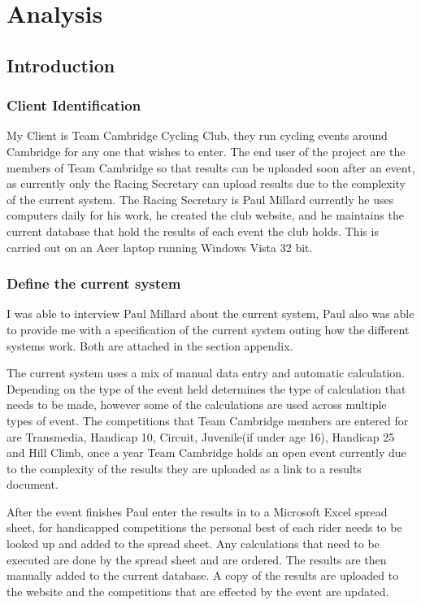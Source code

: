 \chapter{Analysis}

\section{Introduction}

\subsection{Client Identification}
My Client is Team Cambridge Cycling Club, they run cycling events around Cambridge for any one that wishes to enter. The end user of the project are the members of Team Cambridge so that results can be uploaded soon after an event, as currently only the Racing Secretary can upload results due to the complexity of the current system. The Racing Secretary is Paul Millard currently he uses computers daily for his work, he created the club website, and he maintains the current database that hold the results of each event the club holds. This is carried out on an Acer laptop running Windows Vista 32 bit.
\subsection{Define the current system}
I was able to interview Paul Millard about the current system, Paul also was able to provide me with a specification of the current system outing how the different systems work. Both are attached in the section appendix.

The current system uses a mix of manual data entry and automatic calculation. Depending on the type of the event held determines the type of calculation that needs to be made, however some of the calculations are used across multiple types of event. The competitions that Team Cambridge members are entered for are Transmedia, Handicap 10, Circuit, Juvenile(if under age 16), Handicap 25  and Hill Climb, once a year Team Cambridge holds an open event currently due to the complexity of the results they are uploaded as a link to a results document. 

After the event finishes Paul enter the results in to a Microsoft Excel spread sheet, for handicapped competitions the personal best of each rider needs to be looked up and added to the spread sheet. Any calculations that need to be executed are done by the spread sheet and are ordered. The results are then manually added to the current database. A copy of the results are uploaded to the website and the competitions that are effected by the event are updated.

